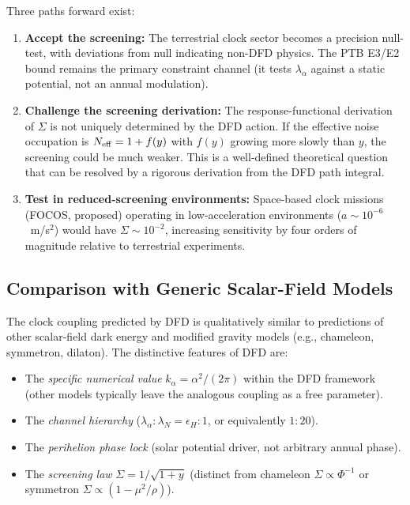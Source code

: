 \documentclass[twocolumn,showpacs,preprintnumbers,amsmath,amssymb,prd]{revtex4-2}
\newcommand{\kalpha}{k_\alpha}
\begin{document}
Three paths forward exist:
\begin{enumerate}
\item \textbf{Accept the screening:} The terrestrial clock sector
  becomes a precision null-test, with deviations from null
  indicating non-DFD physics.  The PTB E3/E2 bound remains the
  primary constraint channel (it tests $\lambda_\alpha$ against
  a static potential, not an annual modulation).

\item \textbf{Challenge the screening derivation:} The
  response-functional derivation of $\Sigma$ is not uniquely
  determined by the DFD action.  If the effective noise occupation
  is $N_{\rm eff} = 1 + f(y)$ with $f(y)$ growing more slowly
  than $y$, the screening could be much weaker.  This is a
  well-defined theoretical question that can be resolved by a
  rigorous derivation from the DFD path integral.

\item \textbf{Test in reduced-screening environments:} Space-based
  clock missions (FOCOS, proposed) operating in low-acceleration
  environments ($a \sim 10^{-6}$~m/s$^2$) would have
  $\Sigma \sim 10^{-2}$, increasing sensitivity by four orders
  of magnitude relative to terrestrial experiments.
\end{enumerate}

\subsection{Comparison with Generic Scalar-Field Models}

The clock coupling predicted by DFD is qualitatively similar to
predictions of other scalar-field dark energy and modified gravity
models (e.g., chameleon, symmetron, dilaton).  The distinctive
features of DFD are:
\begin{itemize}
\item The \emph{specific numerical value} $\kalpha = \alpha^2/(2\pi)$
  within the DFD framework (other models typically leave the
  analogous coupling as a free parameter).
\item The \emph{channel hierarchy} ($\lambda_\alpha : \lambda_N
  = \epsilon_H : 1$, or equivalently $1:20$).
\item The \emph{perihelion phase lock} (solar potential driver, not
  arbitrary annual phase).
\item The \emph{screening law} $\Sigma = 1/\sqrt{1+y}$ (distinct
  from chameleon $\Sigma \propto \Phi^{-1}$ or symmetron
  $\Sigma \propto (1-\mu^2/\rho)$).
\end{itemize}
\end{document}
